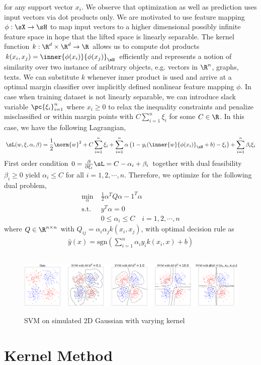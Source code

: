 \documentclass[11pt]{article}
\begin{document}
for any support vector $x_i$. We observe that optimization as well as prediction uses input vectors via dot products only. We are motivated to use feature mapping $\phi:\sX\to\sH$ to map input vectors to a higher dimensional possibly infinite feature space in hope that the lifted space is linearly separable. The kernel function $k: \R^d\times\R^d \to \R$ allows us to compute dot products $k(x_i,x_j)=\inner{\phi(x_i)}{\phi(x_j)}_{\sH}$ efficiently and represents a notion of similarity over two instance of aribtrary objects, e.g. vectors in $\R^n$, graphs, texts. We can substitute $k$ whenever inner product is used and arrive at a optimal margin classifier over implicitly defined nonlinear feature mapping $\phi$. In case when training dataset is not linearly separable, we can introduce slack variable $\pc{\xi_i}_{i=1}^n$ where $x_i\geq 0$ to relax the inequality constraints and penalize misclassified or within margin points with $C\sum_{i=1}^n \xi_i$ for some $C\in\R$. In this case, we have the following Lagrangian,
\begin{align*}
    \sL(w,\xi,\alpha,\beta)
        = \frac{1}{2}\norm{w}^2 + C\sum_{i=1}^n \xi_i + \sum_{i=1}^n \alpha \left( 1-y_i ( \inner{w}{\phi(x_i)}_{\sH} + b )-\xi_i \right) + \sum_{i=1}^n \beta_i \xi_i
\end{align*}
First order condition $0 = \frac{\partial}{\partial \xi_i}\sL = C - \alpha_i + \beta_i$ together with dual feasibility $\beta_i\geq 0$ yield $\alpha_i \leq C$ for all $i=1,2,\cdots,n$. Therefore, we optimize for the following dual problem,
\begin{align*}
    \min_{\alpha}
        \;& \frac{1}{2} \alpha^T Q \alpha - 1^T \alpha  \\
    \text{s.t.}
    \;& y^T\alpha = 0 \\
    \;& 0\leq \alpha_i \leq C \quad i=1,2,\cdots, n
\end{align*}
where $Q \in \R^{n\times n}$ with $Q_{ij} = \alpha_i \alpha_j k(x_i,x_j)$,
with optimal decision rule as
\begin{align*}
    \hat{y}(x) = \text{sgn}\left(
        \sum_{i=1}^n \alpha_i y_i k(x_i,x) + b
    \right)
\end{align*}
 
\begin{center}
\begin{figure}[h!]
    \includegraphics[height=3cm]{assets/svm_on_2d_gaussian_vary_kernel.png} 
    \caption{SVM on simulated 2D Gaussian with varying kernel}
\end{figure}
\end{center}


\section{Kernel Method}



\newpage
\printbibliography 
\end{document}
